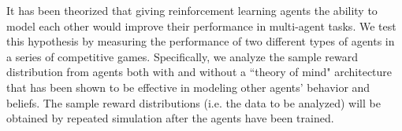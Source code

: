 \documentclass{article}
\begin{document}
	It has been theorized that giving reinforcement learning agents the ability to model each other would improve their performance in multi-agent tasks. We test this hypothesis by measuring the performance of two different types of agents in a series of competitive games. Specifically, we analyze the sample reward distribution from agents both with and without a ``theory of mind" architecture that has been shown to be effective in modeling other agents' behavior and beliefs. The sample reward distributions (i.e. the data to be analyzed) will be obtained by repeated simulation after the agents have been trained.
\end{document}
